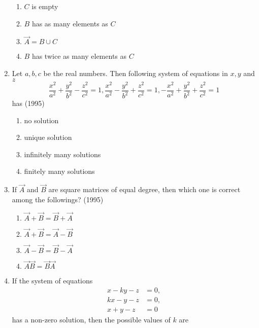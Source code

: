 \begin{enumerate}
\begin{multicols}{2}
\begin{enumerate}
				\item $C$ is empty
				\item $B$ has as many elements as $C$
				\item $\vec{A} = B \cup C$
				\item $B$ has twice as many elements as $C$
			\end{enumerate}
		\end{multicols}
	\item Let $a, b, c$ be the real numbers. Then following system of
		equations in $x, y$ and $z$ 
		$$
		\frac{x^2}{a^2} + \frac{y^2}{b^2} - \frac{z^2}{c^2} = 1	,
		\frac{x^2}{a^2} - \frac{y^2}{b^2} + \frac{z^2}{c^2} = 1	,
		-\frac{x^2}{a^2} + \frac{y^2}{b^2} + \frac{z^2}{c^2} = 1
		$$ has	
		\hfill (1995)

		\begin{multicols}{2}
			\begin{enumerate}
				\item no solution
				\item unique solution
				\columnbreak
				\item infinitely many solutions
				\item finitely many solutions
			\end{enumerate}
		\end{multicols}
%
	\item If $\vec{A}$ and $\vec{B}$ are square matrices of equal degree, then which
		one is correct among the followings?
		\hfill (1995)
%
		\begin{multicols}{2}
			\begin{enumerate}
				\item $\vec{A} + \vec{B} = \vec{B} + \vec{A}$
				\item $\vec{A} + \vec{B} = \vec{A} - \vec{B}$
				\columnbreak
				\item $\vec{A} - \vec{B} = \vec{B} - \vec{A}$
				\item $\vec{A}\vec{B} = \vec{B}\vec{A}$
			\end{enumerate}
		\end{multicols}
\item If the system of equations
    \begin{align*}
	    x-ky-z&=0 ,\\ kx-y-z&=0, \\ x+y-z&=0
    \end{align*} has a non-zero  solution,  then the possible values of $k$ are 
    \hfill{}
    \begin{multicols}{4}

\end{multicols}
\end{enumerate}
